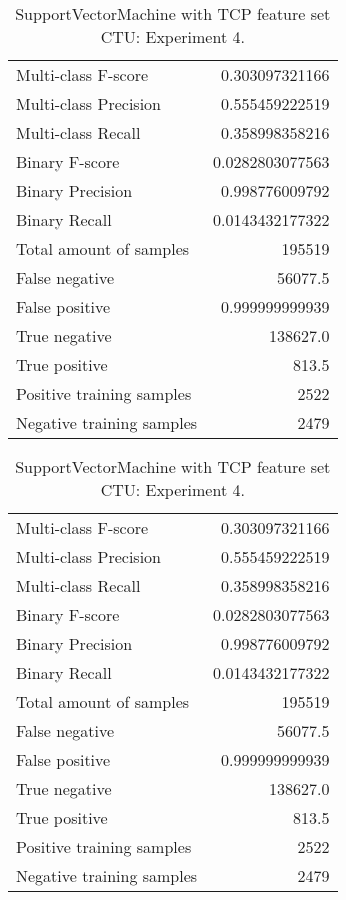 \begin{table}[H]
\begin{minipage}{0.5\textwidth}
\caption{SupportVectorMachine with TCP feature set CTU: Experiment 3.}
\centering
\begin{tabular}{l r}
\toprule
Multi-class F-score & 0.303097321166 \\
Multi-class Precision & 0.555459222519 \\
Multi-class Recall & 0.358998358216 \\
\midrule
Binary F-score & 0.0282803077563 \\
Binary Precision & 0.998776009792 \\
Binary Recall & 0.0143432177322 \\
\midrule
Total amount of samples & 195519 \\
False negative & 56077.5 \\
False positive & 0.999999999939 \\
True negative & 138627.0 \\
True positive & 813.5 \\
\midrule
Positive training samples & 2522 \\
Negative training samples & 2479 \\
\bottomrule
\end{tabular}
\end{minipage}
\hfillx
\begin{minipage}{0.5\textwidth}
\caption{SupportVectorMachine with TCP feature set CTU: Experiment 4.}
\centering
\begin{tabular}{l r}
\toprule
Multi-class F-score & 0.303097321166 \\
Multi-class Precision & 0.555459222519 \\
Multi-class Recall & 0.358998358216 \\
\midrule
Binary F-score & 0.0282803077563 \\
Binary Precision & 0.998776009792 \\
Binary Recall & 0.0143432177322 \\
\midrule
Total amount of samples & 195519 \\
False negative & 56077.5 \\
False positive & 0.999999999939 \\
True negative & 138627.0 \\
True positive & 813.5 \\
\midrule
Positive training samples & 2522 \\
Negative training samples & 2479 \\
\bottomrule
\end{tabular}
\end{minipage}
\end{table}
